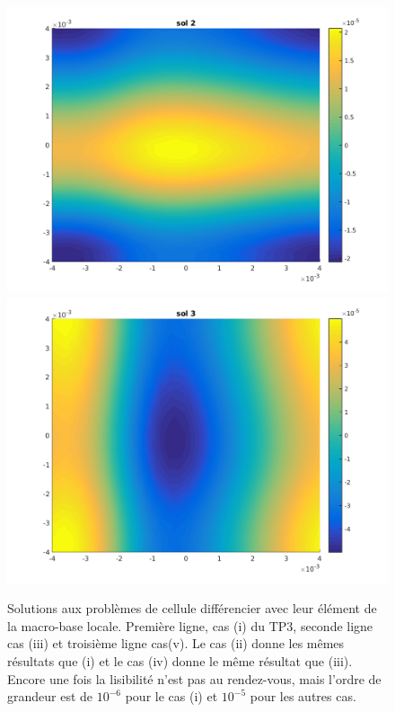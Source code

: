 \documentclass[11pt]{article}
\begin{document}
\begin{figure}
  \includegraphics[width=.3\textwidth]{Code/w2_4.png}
  \includegraphics[width=.3\textwidth]{Code/w3_4.png} \\
  \caption{Solutions aux problèmes de cellule différencier avec leur élément de la macro-base locale. Première ligne, cas (i) du TP3, seconde ligne
    cas (iii) et troisième ligne cas(v). Le cas (ii) donne les mêmes résultats que (i) et le cas (iv) donne le même résultat que (iii). Encore une fois la lisibilité n'est pas au
    rendez-vous, mais l'ordre de grandeur est de $10^{-6}$ pour le cas (i) et $10^{-5}$ pour les autres cas.}
  \label{fig:ws}
\end{figure}
\end{document}
